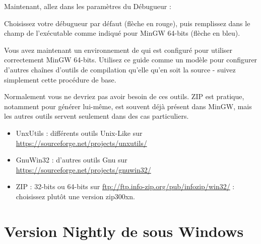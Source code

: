 

Maintenant, allez dans les paramètres du Débugueur :


Choisissez votre débugueur par défaut (flèche en rouge), puis remplissez dans le champ de l'exécutable comme indiqué pour MinGW 64-bits (flèche en bleu).



Vous avez maintenant un environnement de \codeblocks qui est configuré pour utiliser correctement MinGW 64-bits. Utilisez ce guide comme un modèle pour configurer d'autres chaînes d'outils de compilation qu'elle qu'en soit la source - suivez simplement cette procédure de base.

Normalement vous ne devriez pas avoir besoin de ces outils. ZIP est pratique, notamment pour générer \codeblocks lui-même, est souvent déjà présent dans MinGW, mais les autres outils servent seulement dans des cas particuliers.
\begin{itemize}
\item UnxUtils : différents outils Unix-Like sur \url{https://sourceforge.net/projects/unxutils/}
\item GnuWin32 : d'autres outils Gnu sur \url{https://sourceforge.net/projects/gnuwin32/}
\item ZIP : 32-bits ou 64-bits sur \url{ftp://ftp.info-zip.org/pub/infozip/win32/} : choisissez plutôt une version zip300xn.
\end{itemize}

\section{Version Nightly de \codeblocks sous Windows}

